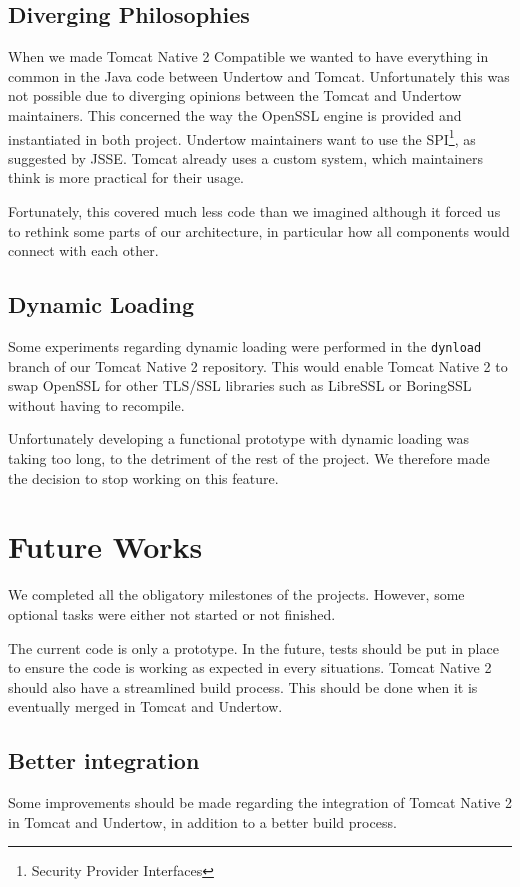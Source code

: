 \documentclass[11pt,a4paper,bibliography=totocnumbered]{scrartcl}
\def\mytitle{Tomcat Native 2}
\begin{document}
\subsection{Diverging Philosophies}
When we made \mytitle{} Compatible we wanted to have everything in common in the Java code between Undertow and Tomcat. Unfortunately this was not possible due to diverging opinions between the Tomcat and Undertow maintainers. This concerned the way the OpenSSL engine is provided and instantiated in both project. Undertow maintainers want to use the SPI\footnote{Security Provider Interfaces}, as suggested by JSSE. Tomcat already uses a custom system, which maintainers think is more practical for their usage.

Fortunately, this covered much less code than we imagined although it forced us to rethink some parts of our architecture, in particular how all components would connect with each other.
\subsection{Dynamic Loading}
Some experiments regarding dynamic loading were performed in the \texttt{dynload} branch of our \mytitle{} repository. This would enable \mytitle{} to swap OpenSSL for other TLS/SSL libraries such as LibreSSL or BoringSSL without having to recompile.

 Unfortunately developing a functional prototype with dynamic loading was taking too long, to the detriment of the rest of the project. We therefore made the decision to stop working on this feature.

\section{Future Works}
We completed all the obligatory milestones of the projects. However, some optional tasks were either not started or not finished.

The current code is only a prototype. In the future, tests should be put in place to ensure the code is working as expected in every situations. \mytitle{} should also have a streamlined build process. This should be done when it is eventually merged in Tomcat and Undertow.

\subsection{Better integration}
Some improvements should be made regarding the integration of \mytitle{} in Tomcat and Undertow, in addition to a better build process.
\end{document}
